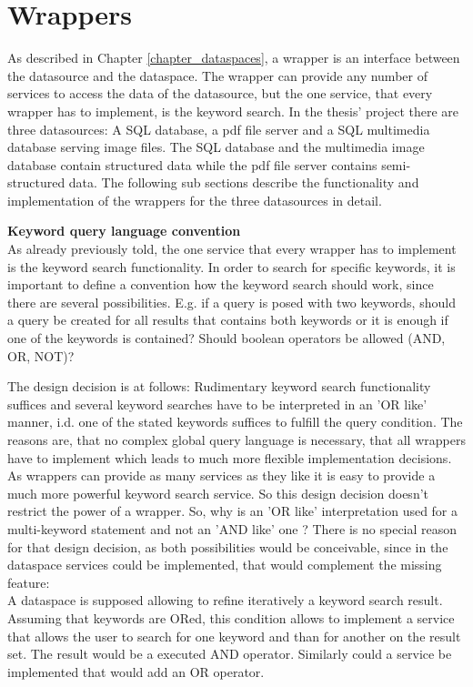 \section{Wrappers}

As described in Chapter \ref{chapter_dataspaces}, a wrapper is  an interface between the datasource and the dataspace. The wrapper can provide any number of services to access the data of the datasource, but the one service, that every wrapper has to implement, is the keyword search.
In the thesis' project there are three datasources: A SQL database, a pdf file server and a SQL multimedia database serving image files. The SQL database and the multimedia image database contain
structured data while the pdf file server contains semi-structured data.
The following sub sections describe the functionality and implementation of the wrappers for the three datasources in detail.

\textbf {Keyword query language convention}\\
As already previously told, the one service that every wrapper has to implement is the keyword search functionality. In order to search for specific keywords, it is important to define a convention how the keyword search should work, since there are several possibilities. E.g. if a query is posed with two keywords, should a query be created for all results that contains both keywords or it is enough if one of the keywords is contained? Should boolean operators be allowed (AND, OR, NOT)? 

The design decision is at follows: Rudimentary keyword search functionality suffices and several keyword searches have to be interpreted in an 'OR like' manner, i.d. one of the stated keywords suffices to fulfill the query condition. The reasons are, that no complex global query language is necessary, that all wrappers have to implement which leads to much more flexible implementation decisions. As wrappers can provide as many services as they like it is easy to provide a much more powerful keyword search service. So this design decision doesn't restrict the power of a wrapper.
So, why is an 'OR like' interpretation used for a multi-keyword statement and not an 'AND like' one ? There is no special reason for that design decision, as both possibilities would be conceivable, since in the dataspace services could be implemented, that would complement the missing feature:\\
A dataspace is supposed allowing to refine iteratively a keyword search result. Assuming that keywords are ORed, this condition allows to implement a service that allows the user to search for one keyword and than for another on the result set. The result would be a executed AND operator. Similarly could a service be implemented that would add an OR operator. 


